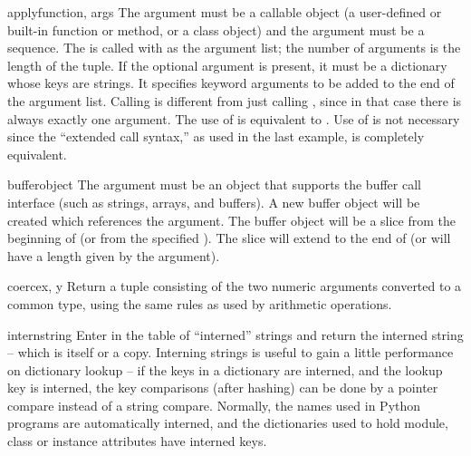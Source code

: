 
\begin{funcdesc}{apply}{function, args}
  The  argument must be a callable object (a
  user-defined or built-in function or method, or a class object) and
  the  argument must be a sequence.  The  is
  called with  as the argument list; the number of arguments
  is the length of the tuple.
  If the optional  argument is present, it must be a
  dictionary whose keys are strings.  It specifies keyword arguments
  to be added to the end of the argument list.
  Calling  is different from just calling
  , since in that case there is always
  exactly one argument.  The use of  is equivalent
  to .
  Use of  is not necessary since the ``extended call
  syntax,'' as used in the last example, is completely equivalent.

\end{funcdesc}

\begin{funcdesc}{buffer}{object}
  The  argument must be an object that supports the buffer
  call interface (such as strings, arrays, and buffers).  A new buffer
  object will be created which references the  argument.
  The buffer object will be a slice from the beginning of 
  (or from the specified ). The slice will extend to the
  end of  (or will have a length given by the 
  argument).
\end{funcdesc}

\begin{funcdesc}{coerce}{x, y}
  Return a tuple consisting of the two numeric arguments converted to
  a common type, using the same rules as used by arithmetic
  operations.
\end{funcdesc}

\begin{funcdesc}{intern}{string}
  Enter  in the table of ``interned'' strings and return
  the interned string -- which is  itself or a copy.
  Interning strings is useful to gain a little performance on
  dictionary lookup -- if the keys in a dictionary are interned, and
  the lookup key is interned, the key comparisons (after hashing) can
  be done by a pointer compare instead of a string compare.  Normally,
  the names used in Python programs are automatically interned, and
  the dictionaries used to hold module, class or instance attributes
  have interned keys.  
\end{funcdesc}

